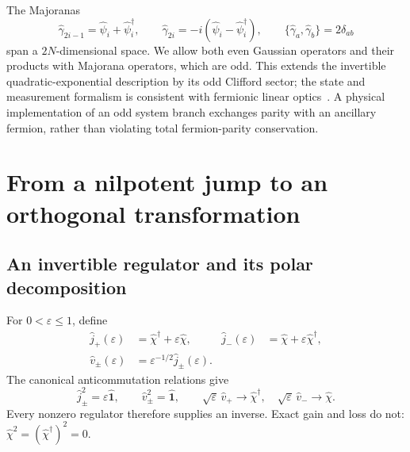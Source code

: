 \documentclass[aps,prb,onecolumn,nofootinbib,superscriptaddress]{revtex4-2}
\newcommand{\One}{\hat{\mathbf{1}}}
\newcommand{\eps}{\varepsilon}
\begin{document}
The Majoranas
\begin{equation}
 \hat\gamma_{2i-1}=\hat\psi_i+\hat\psi_i^\dagger,\qquad
 \hat\gamma_{2i}=-i(\hat\psi_i-\hat\psi_i^\dagger),\qquad
 \{\hat\gamma_a,\hat\gamma_b\}=2\delta_{ab}
 \label{eq:majoranas}
\end{equation}
span a $2N$-dimensional space. We allow both even Gaussian operators and
their products with Majorana operators, which are odd. This extends the
invertible quadratic-exponential description by its odd Clifford sector;
the state and measurement formalism is consistent with fermionic linear
optics~\cite{Bravyi2005}. A physical implementation of an odd system branch
exchanges parity with an ancillary fermion, rather than violating total
fermion-parity conservation.

\section{From a nilpotent jump to an orthogonal transformation}
\subsection{An invertible regulator and its polar decomposition}
For $0<\eps\leq1$, define
\begin{align}
 \hat j_+(\eps)&=\hat\chi^\dagger+\eps\hat\chi,&
 \hat j_-(\eps)&=\hat\chi+\eps\hat\chi^\dagger,\nonumber\\
 \hat v_\pm(\eps)&=\eps^{-1/2}\hat j_\pm(\eps).
 \label{eq:regulators}
\end{align}
The canonical anticommutation relations give
\begin{equation}
 \hat j_\pm^2=\eps\One,\qquad \hat v_\pm^2=\One,\qquad
 \sqrt\eps\,\hat v_+\longrightarrow\hat\chi^\dagger,\quad
 \sqrt\eps\,\hat v_-\longrightarrow\hat\chi.
 \label{eq:limits}
\end{equation}
Every nonzero regulator therefore supplies an inverse. Exact gain and
loss do not: $\hat\chi^2=(\hat\chi^\dagger)^2=0$.
\end{document}

